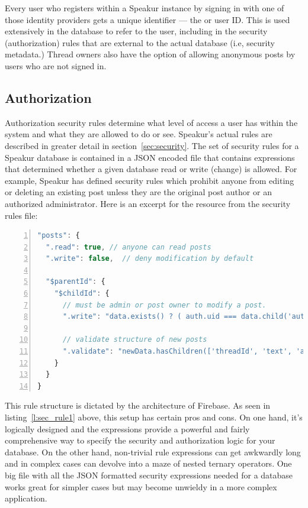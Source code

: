 Every user who registers within a Speakur instance by signing in with one of those identity providers gets a unique identifier --- the  or user ID. 
This  is used extensively in the database to refer to the user, including in the security (authorization) rules that are external to the actual database (i.e, security metadata.) 
Thread owners also have the option of allowing anonymous posts by users who are not signed in.

\subsection{Authorization}
Authorization security rules determine what level of access a user has within the system and what they are allowed to do or see.
Speakur's actual rules are described in greater detail in section~\ref{sec:security}.
The set of security rules for a Speakur database is contained in a JSON encoded file that contains expressions that determined whether a given database read or write (change) is allowed. 
For example, Speakur has defined security rules which prohibit anyone from editing or deleting an existing post unless they are the original post author or an authorized administrator.
Here is an excerpt for the  resource from the security rules file:

\begin{lstlisting}[language=JavaScript,numbers=left,numberstyle=\scriptsize,caption=
{Security rule for posts (user messages).},label=l:sec_rule1,captionpos=below]
"posts": {
  ".read": true, // anyone can read posts
  ".write": false,  // deny modification by default

  "$parentId": {
    "$childId": {
      // must be admin or post owner to modify a post.
      ".write": "data.exists() ? ( auth.uid === data.child('author').child('uid').val() || root.child('admins').child(auth.uid).child('scope').val() === '*' ) : true",
      
      // validate structure of new posts
      ".validate": "newData.hasChildren(['threadId', 'text', 'author']) && newData.child('timestamp').val() > 1"
    }
  }
}
\end{lstlisting}

This rule structure is dictated by the architecture of Firebase.
As seen in listing~\ref{l:sec_rule1} above, this setup has certain pros and cons. 
On one hand, it's logically designed and the expressions provide a powerful and fairly comprehensive way to specify the 
security and authorization logic for your database.
On the other hand, non-trivial rule expressions can get awkwardly long and in complex cases can devolve into a maze of nested ternary operators.
One big file with all the JSON formatted security expressions needed for a database works great for simpler cases but may become unwieldy in a more complex application.

